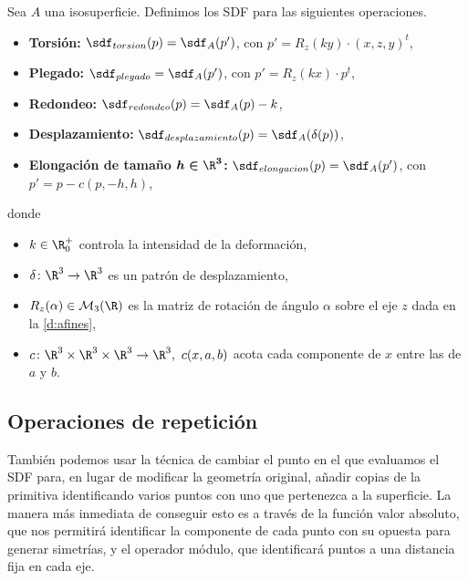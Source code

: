 \begin{definicion}
    Sea $A$ una isosuperficie. Definimos los SDF para las siguientes operaciones.
    \begin{itemize}
        
        \item \textbf{Torsión: } $\sdf_{torsion}(p) = \sdf_{A}(p')$, con $p' = R_z(ky)\cdot (x,z,y)^t$,
        \item \textbf{Plegado: } $\sdf_{plegado} =\sdf_{A}(p')$, con $p' = R_z(kx)\cdot p^t$,
        \item \textbf{Redondeo: } $\sdf_{redondeo}(p) = \sdf_{A}(p) - k$,
        \item \textbf{Desplazamiento: } $\sdf_{desplazamiento}(p) = \sdf_{A}(\delta(p))$,
        \item \textbf{Elongación de tamaño $\boldsymbol{h\in \R^3}$: } $\sdf_{elongacion}(p) = \sdf_{A}(p')$, con $p' = p - c(p, -h, h)$,
    \end{itemize}

    donde
    \begin{itemize}
        \item $k\in \R^+_0$ controla la intensidad de la deformación,
        \item $\delta\colon \R^3\to \R^3$ es un patrón de desplazamiento,
        \item $R_z(\alpha)\in \mathcal{M}_3(\R)$ es la matriz de rotación de ángulo $\alpha$ sobre el eje $z$ dada en la \autoref{d:afines},
        \item $c\colon \R^3\times \R^3 \times \R^3 \to \R^3,\ c(x,a,b)$ acota cada componente de $x$ entre las de $a$ y $b$.
    \end{itemize}
\end{definicion}

\subsection{Operaciones de repetición}
También podemos usar la técnica de cambiar el punto en el que evaluamos el SDF para, en lugar de modificar la geometría original, añadir copias de la primitiva identificando varios puntos con uno que pertenezca a la superficie. La manera más inmediata de conseguir esto es a través de la función valor absoluto, que nos permitirá identificar la componente de cada punto con su opuesta para generar simetrías, y el operador módulo, que identificará puntos a una distancia fija en cada eje.

